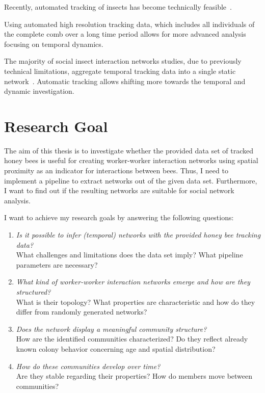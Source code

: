 Recently, automated tracking of insects has become technically feasible~\cite{wario2015automatic, crall2015beetag, fiala2005comparing}.

Using automated high resolution tracking data, which includes all individuals of the complete comb over a long time period allows for more advanced analysis focusing on temporal dynamics.


The majority of social insect interaction networks studies, due to previously technical limitations, aggregate temporal tracking data into a single static network~\cite[Chapter~15]{krause2014animal}.
Automatic tracking allows shifting more towards the temporal and dynamic investigation.


\section{Research Goal}
The aim of this thesis is to investigate whether the provided data set of tracked honey bees is useful for creating worker-worker interaction networks using spatial proximity as an indicator for interactions between bees. Thus, I need to implement a pipeline to extract networks out of the given data set. Furthermore, I want to find out if the resulting networks are suitable for social network analysis.

I want to achieve my research goals by answering the following questions:

\begin{enumerate}
\item \emph{Is it possible to infer (temporal) networks with the provided honey bee tracking data?}\\
What challenges and limitations does the data set imply?
What pipeline parameters are necessary?
\item \emph{What kind of worker-worker interaction networks emerge and how are they structured?}\\
What is their topology?
What properties are characteristic and how do they differ from randomly generated networks?
\item \emph{Does the network display a meaningful community structure?}\\
How are the identified communities characterized?
Do they reflect already known colony behavior concerning age and spatial distribution?
\item \emph{How do these communities develop over time?}\\
Are they stable regarding their properties?
How do members move between communities?
\end{enumerate}

